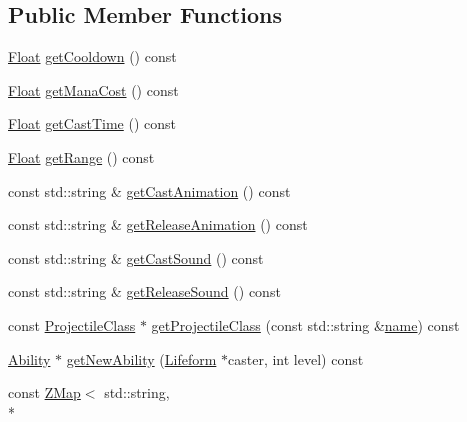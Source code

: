 \subsection*{Public Member Functions}
\begin{DoxyCompactItemize}
\item 
\hyperlink{namespaceZeta_a1e0a1265f9b3bd3075fb0fabd39088ba}{Float} \hyperlink{classZeta_1_1ActiveAbilityClass_af6927e9b8b25c44539a5e1f563f8ec7d}{get\+Cooldown} () const 
\item 
\hyperlink{namespaceZeta_a1e0a1265f9b3bd3075fb0fabd39088ba}{Float} \hyperlink{classZeta_1_1ActiveAbilityClass_aad91e6ee0b80697e2012e9973231ff19}{get\+Mana\+Cost} () const 
\item 
\hyperlink{namespaceZeta_a1e0a1265f9b3bd3075fb0fabd39088ba}{Float} \hyperlink{classZeta_1_1ActiveAbilityClass_afda1ffbd0f535675ac77a6d77f3e52eb}{get\+Cast\+Time} () const 
\item 
\hyperlink{namespaceZeta_a1e0a1265f9b3bd3075fb0fabd39088ba}{Float} \hyperlink{classZeta_1_1ActiveAbilityClass_a74c2f5b18dcff1dde6e66b6e3cde6985}{get\+Range} () const 
\item 
const std\+::string \& \hyperlink{classZeta_1_1ActiveAbilityClass_ab0346d994703ba5a12bdef64024ea9bd}{get\+Cast\+Animation} () const 
\item 
const std\+::string \& \hyperlink{classZeta_1_1ActiveAbilityClass_a15910a91b272b272b2e5baff4b4d7d9e}{get\+Release\+Animation} () const 
\item 
const std\+::string \& \hyperlink{classZeta_1_1ActiveAbilityClass_a87de08ce87355e4c9ee4cbb75d25abcf}{get\+Cast\+Sound} () const 
\item 
const std\+::string \& \hyperlink{classZeta_1_1ActiveAbilityClass_a61f29173a1b156cedbbe5928d9e74aa7}{get\+Release\+Sound} () const 
\item 
const \hyperlink{classZeta_1_1ProjectileClass}{Projectile\+Class} $\ast$ \hyperlink{classZeta_1_1ActiveAbilityClass_a180f0054f453213eb15e925fa919a01a}{get\+Projectile\+Class} (const std\+::string \&\hyperlink{classZeta_1_1Resource_a44c5721216f4beb31c0b3d2ef2aecf1d}{name}) const 
\item 
\hyperlink{classZeta_1_1Ability}{Ability} $\ast$ \hyperlink{classZeta_1_1ActiveAbilityClass_a7bc4309f792992dd7fb24bd9f1153b01}{get\+New\+Ability} (\hyperlink{classZeta_1_1Lifeform}{Lifeform} $\ast$caster, int level) const 
\item 
const \hyperlink{namespaceZeta_a9af2e12c4e432d2a1725f19e5a648a04}{Z\+Map}$<$ std\+::string, \\*

\end{DoxyCompactItemize}
